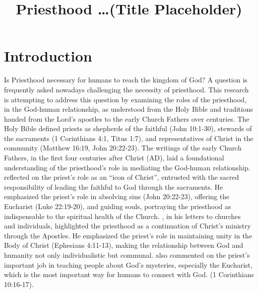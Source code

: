 \documentclass[12pt,doc]{apa7}   	%
\title{Priesthood \dots (Title Placeholder)}	%
\begin{document}
\maketitle


\section{Introduction}
Is Priesthood necessary for humans to reach the kingdom of God?  A question is frequently asked nowadays challenging the necessity of priesthood.  This research is attempting to address this question by examining the roles of the priesthood, in the God-human relationship, as understood from the Holy Bible and traditions handed from the Lord's apostles to the early Church Fathers over centuries. The Holy Bible \citep{nelson_nkjv} defined priests as shepherds of the faithful (John 10:1-30), stewards of the sacraments (1 Corinthians 4:1, Titus 1:7), and representatives of Christ in the community (Matthew 16:19, John 20:22-23). The writings of the early Church Fathers, in the first four centuries after Christ (AD), laid a foundational understanding of the priesthood’s role in mediating the God-human relationship.  \citet{priesthood_chrysostom, complete_work_chrysostom} reflected on the priest’s role as an ``icon of Christ'', entrusted with the sacred responsibility of leading the faithful to God through the sacraments. He emphasized the priest’s role in absolving sins (John 20:22-23), offering the Eucharist (Luke 22:19-20), and guiding souls, portraying the priesthood as indispensable to the spiritual health of the Church.  \citet{epistles_ignatius}, in his letters to churches and individuals, highlighted the priesthood as a continuation of Christ’s ministry through the Apostles. He emphasized the priest’s role in maintaining unity in the Body of Christ (Ephesians 4:11-13), making the relationship between God and humanity not only individualistic but communal. \citet{st_basil_letters} also commented on the priest’s important job in teaching people about God’s mysteries, especially the Eucharist, which is the most important way for humans to connect with God. (1 Corinthians 10:16-17). 
\end{document}
